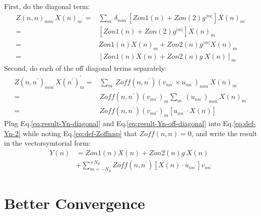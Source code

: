 \documentclass [10pt,letterpaper]{article}
\begin{document}
First, do the diagonal term:
\begin{equation} \label{eq:result-Yn-diagonal}
	\begin{split}
		Z(n,n)_{m m^\prime}
		X(n)_{m^\prime}
		=&
		\sum\nolimits_{m^\prime}
		\delta_{m m^\prime}
		[ Zon1(n)+Zon(2)g^{\lvert m \rvert} ]
		X(n)_{m^\prime} 
		\\
		=&
		[ Zon1(n)+Zon(2)g^{\lvert m \rvert} ]
		X(n)_{m} 
		\\
		=&
		Zon1(n)X(n)_m
		+
		Zon2(n)g^{\lvert m \rvert} X(n)_m
		\\
		=&
		[Zon1(n)X(n)+Zon2(n)g\ X(n)]_m
	\end{split}
\end{equation}
Second, do each of the off diagonal terms separately:
\begin{equation} \label{eq:result-Yn-off-diagonal}
	\begin{split}
		Z(n,n^\prime)_{m m^\prime}
		X(n^\prime)_m^\prime
		=&
		\sum\nolimits_{m^\prime}
		Zoff(n,n^\prime)
		(
		v_{n n^\prime}
		\times
		u_{n n^\prime}
		)_{m m^\prime}
		X(n)_{m^\prime}
		\\
		=&
		Zoff(n,n^\prime)
		(v_{n n^\prime})_m
		\sum\nolimits_{m^\prime}
		(
		u_{n n^\prime}
		)_{m m^\prime}
		X(n)_{m^\prime} 
		\\
		=&
		Zoff(n,n^\prime)
		(v_{n n^\prime})_m
		[
			u_{n n^\prime}
			\cdot
			X(n)
		]
	\end{split}
\end{equation}
Plug Eq.\eqref{eq:result-Yn-diagonal} and Eq.\eqref{eq:result-Yn-off-diagonal} into Eq.\eqref{eq:def-Yn-2} while noting Eq.\eqref{eq:def-Zoffnnp} that $Zoff(n,n)=0$, and write the result in the vectorsymtorial form:
\begin{equation} \label{eq:result-Yn}
	\begin{split}
		Y(n)
		&= 
		Zon1(n) X(n)
		+
		Zon2(n) g\ X(n)
		\\
		&+
		\sum \nolimits_{m=-N_d}^{+N_d}
		Zoff(n,n^\prime)
		[ X(n)\cdot u_{n n^\prime} ]
		v_{n n^\prime}
	\end{split}
\end{equation}





\section{Better Convergence}
\label{sec:better-convergence}
\end{document}
